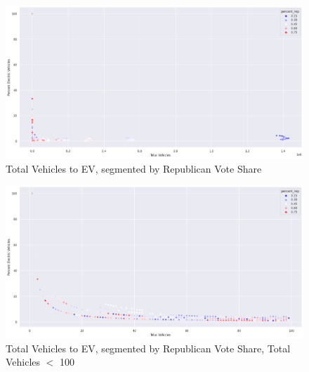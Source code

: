 \documentclass{article}
\begin{document}
\begin{figure}[!htb]
  \includegraphics[width=\linewidth]{3dplot}
  \caption{Total Vehicles to EV, segmented by Republican Vote Share}
\end{figure}

\begin{figure}[!htb]
  \includegraphics[width=\linewidth]{3dplot2}
  \caption{Total Vehicles to EV, segmented by Republican Vote Share, Total Vehicles $ < $ 100}
\end{figure}

\newpage

\printbibliography[
title={References}
]
\end{document}
